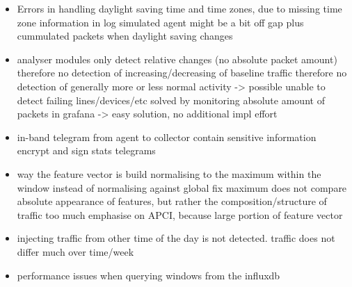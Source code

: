 
\begin{itemize}
	\item Errors in handling daylight saving time and time zones, due to missing time zone information in log
		\subitem simulated agent might be a bit off
		\subitem gap plus cummulated packets when daylight saving changes
	\item analyser modules only detect relative changes (no absolute packet amount)
		\subitem therefore no detection of increasing/decreasing of baseline traffic
		\subitem therefore no detection of generally more or less normal activity -> possible unable to detect failing lines/devices/etc
		\subitem solved by monitoring absolute amount of packets in \gls{grafana} -> easy solution, no additional impl effort
	\item in-band telegram from agent to collector contain sensitive information
		\subitem encrypt and sign stats telegrams
		
	\item way the feature vector is build
		\subitem normalising to the maximum within the window
		\subitem instead of normalising against global fix maximum
		\subitem does not compare absolute appearance of features, but rather the composition/structure of traffic
		\subitem too much emphasise on APCI, because large portion of feature vector
		
	\item injecting traffic from other time of the day is not detected.
		\subitem traffic does not differ much over time/week
	
	\item performance issues when querying windows from the influxdb
		
\end{itemize}